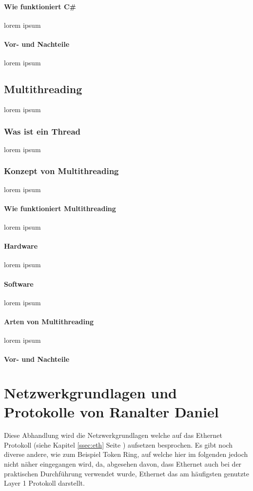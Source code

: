 \documentclass[11pt,a4paper]{report}
\begin{document}
\subsubsection{Wie funktioniert C\#}
lorem ipsum
\subsubsection{Vor- und Nachteile}
lorem ipsum
\section{Multithreading}
lorem ipsum
\subsection{Was ist ein Thread}
lorem ipsum
\subsection{Konzept von Multithreading}
lorem ipsum
\subsubsection{Wie funktioniert Multithreading}
lorem ipsum
\subsubsection{Hardware}
lorem ipsum
\subsubsection{Software}
lorem ipsum
\subsubsection{Arten von Multithreading}
lorem ipsum
\subsubsection{Vor- und Nachteile}

\chapter{Netzwerkgrundlagen und Protokolle von Ranalter Daniel}
Diese Abhandlung wird die Netzwerkgrundlagen welche auf das Ethernet Protokoll (siehe Kapitel \ref{ssec:eth}  Seite \pageref{ssec:eth}) aufsetzen besprochen. Es gibt noch diverse andere, wie zum Beispiel Token Ring, auf welche hier im folgenden jedoch nicht näher eingegangen wird, da, abgesehen davon, dass Ethernet auch bei der praktischen Durchführung verwendet wurde, Ethernet das am häufigsten genutzte Layer 1 Protokoll darstellt. 
\end{document}
